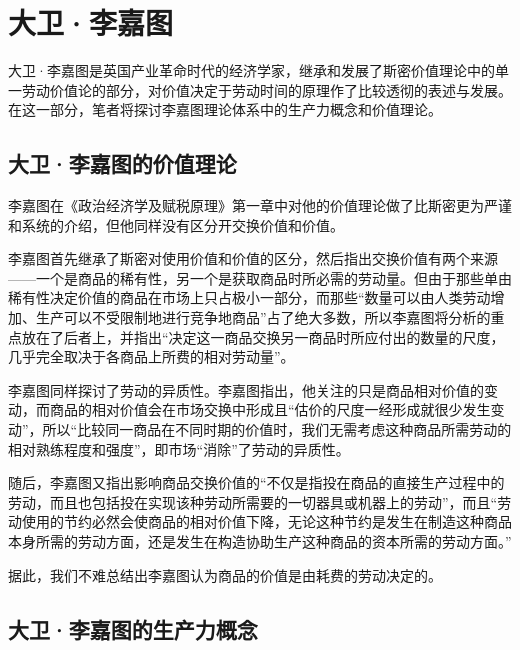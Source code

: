 \section{大卫·李嘉图}

大卫·李嘉图是英国产业革命时代的经济学家，继承和发展了斯密价值理论中的单一劳动价值论的部分，对价值决定于劳动时间的原理作了比较透彻的表述与发展\cite[iv]{DaWei*LiJiaTuZhengZhiJingJiXueJiFuShuiYuanLi2021}。在这一部分，笔者将探讨李嘉图理论体系中的生产力概念和价值理论。

\subsection{大卫·李嘉图的价值理论}

李嘉图在《政治经济学及赋税原理》第一章中对他的价值理论做了比斯密更为严谨和系统的介绍，但他同样没有区分开交换价值和价值。

李嘉图首先继承了斯密对使用价值和价值的区分，然后指出交换价值有两个来源——一个是商品的稀有性，另一个是获取商品时所必需的劳动量\cite[5-6]{DaWei*LiJiaTuZhengZhiJingJiXueJiFuShuiYuanLi2021}。但由于那些单由稀有性决定价值的商品在市场上只占极小一部分，而那些“数量可以由人类劳动增加、生产可以不受限制地进行竞争地商品”占了绝大多数，所以李嘉图将分析的重点放在了后者上，并指出“决定这一商品交换另一商品时所应付出的数量的尺度，几乎完全取决于各商品上所费的相对劳动量”\cite[6]{DaWei*LiJiaTuZhengZhiJingJiXueJiFuShuiYuanLi2021}。

李嘉图同样探讨了劳动的异质性。李嘉图指出，他关注的只是商品相对价值的变动，而商品的相对价值会在市场交换中形成且“估价的尺度一经形成就很少发生变动”，所以“比较同一商品在不同时期的价值时，我们无需考虑这种商品所需劳动的相对熟练程度和强度”，即市场“消除”了劳动的异质性\cite[13-14]{DaWei*LiJiaTuZhengZhiJingJiXueJiFuShuiYuanLi2021}。

随后，李嘉图又指出影响商品交换价值的“不仅是指投在商品的直接生产过程中的劳动，而且也包括投在实现该种劳动所需要的一切器具或机器上的劳动”\cite[17]{DaWei*LiJiaTuZhengZhiJingJiXueJiFuShuiYuanLi2021}，而且“劳动使用的节约必然会使商品的相对价值下降，无论这种节约是发生在制造这种商品本身所需的劳动方面，还是发生在构造协助生产这种商品的资本所需的劳动方面。”\cite[18]{DaWei*LiJiaTuZhengZhiJingJiXueJiFuShuiYuanLi2021}

据此，我们不难总结出李嘉图认为商品的价值是由耗费的劳动决定的。

\subsection{大卫·李嘉图的生产力概念}

